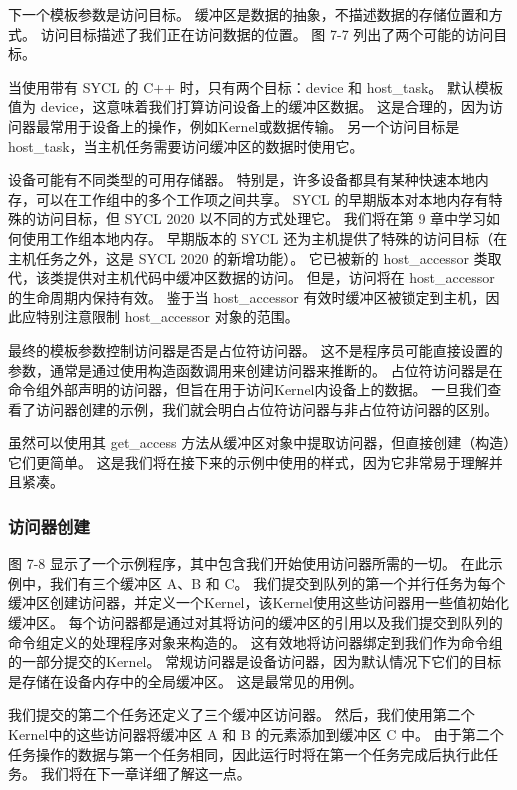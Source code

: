 下一个模板参数是访问目标。 缓冲区是数据的抽象，不描述数据的存储位置和方式。 
访问目标描述了我们正在访问数据的位置。 图 7-7 列出了两个可能的访问目标。

当使用带有 SYCL 的 C++ 时，只有两个目标：device 和 host\_task。 
默认模板值为 device，这意味着我们打算访问设备上的缓冲区数据。 
这是合理的，因为访问器最常用于设备上的操作，例如Kernel或数据传输。 
另一个访问目标是 host\_task，当主机任务需要访问缓冲区的数据时使用它。

设备可能有不同类型的可用存储器。 特别是，许多设备都具有某种快速本地内存，可以在工作组中的多个工作项之间共享。 
SYCL 的早期版本对本地内存有特殊的访问目标，但 SYCL 2020 以不同的方式处理它。 
我们将在第 9 章中学习如何使用工作组本地内存。
早期版本的 SYCL 还为主机提供了特殊的访问目标（在主机任务之外，这是 SYCL 2020 的新增功能）。 
它已被新的 host\_accessor 类取代，该类提供对主机代码中缓冲区数据的访问。 
但是，访问将在 host\_accessor 的生命周期内保持有效。 
鉴于当 host\_accessor 有效时缓冲区被锁定到主机，因此应特别注意限制 host\_accessor 对象的范围。

最终的模板参数控制访问器是否是占位符访问器。 
这不是程序员可能直接设置的参数，通常是通过使用构造函数调用来创建访问器来推断的。 
占位符访问器是在命令组外部声明的访问器，但旨在用于访问Kernel内设备上的数据。 
一旦我们查看了访问器创建的示例，我们就会明白占位符访问器与非占位符访问器的区别。

虽然可以使用其 get\_access 方法从缓冲区对象中提取访问器，但直接创建（构造）它们更简单。 
这是我们将在接下来的示例中使用的样式，因为它非常易于理解并且紧凑。

\subsubsection{访问器创建}
图 7-8 显示了一个示例程序，其中包含我们开始使用访问器所需的一切。 
在此示例中，我们有三个缓冲区 A、B 和 C。
我们提交到队列的第一个并行任务为每个缓冲区创建访问器，并定义一个Kernel，该Kernel使用这些访问器用一些值初始化缓冲区。 
每个访问器都是通过对其将访问的缓冲区的引用以及我们提交到队列的命令组定义的处理程序对象来构造的。 
这有效地将访问器绑定到我们作为命令组的一部分提交的Kernel。 
常规访问器是设备访问器，因为默认情况下它们的目标是存储在设备内存中的全局缓冲区。 这是最常见的用例。

我们提交的第二个任务还定义了三个缓冲区访问器。 
然后，我们使用第二个Kernel中的这些访问器将缓冲区 A 和 B 的元素添加到缓冲区 C 中。
由于第二个任务操作的数据与第一个任务相同，因此运行时将在第一个任务完成后执行此任务。 
我们将在下一章详细了解这一点。

